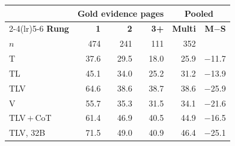 \begin{table}[t]
\centering
\small
\setlength{\tabcolsep}{5pt}
\renewcommand{\arraystretch}{1.12}
\begin{tabular}{@{}lrrrrr@{}}
\toprule
 & \multicolumn{3}{c}{\textbf{Gold evidence pages}} & \multicolumn{2}{c}{\textbf{Pooled}} \\
\cmidrule(lr){2-4}\cmidrule(lr){5-6}
\rowcolor{hdrbg}
\textbf{Rung} & \textbf{1} & \textbf{2} & \textbf{3+} & \textbf{Multi} & \textbf{M$-$S} \\
\rowcolor{hdrbg}
\textcolor{ngray}{\scriptsize$n$}
  & \textcolor{ngray}{\scriptsize474}
  & \textcolor{ngray}{\scriptsize241}
  & \textcolor{ngray}{\scriptsize111}
  & \textcolor{ngray}{\scriptsize352}
  & \\
\midrule
T   & 37.6 & 29.5 & 18.0 & 25.9 & \cellcolor{gapred!12}$-$11.7 \\
TL  & 45.1 & 34.0 & 25.2 & 31.2 & \cellcolor{gapred!17}$-$13.9 \\
TLV & 64.6 & 38.6 & 38.7 & 38.6 & \cellcolor{gapred!42}$-$25.9 \\
V   & 55.7 & 35.3 & 31.5 & 34.1 & \cellcolor{gapred!33}$-$21.6 \\
\midrule
\rowcolor{leverbg}
TLV\,$+$\,CoT & 61.4 & 46.9 & 40.5 & 44.9 & \cellcolor{gapred!22}$-$16.5 \\
\rowcolor{leverbg}
TLV, 32B      & 71.5 & 49.0 & 40.9 & 46.4 & \cellcolor{gapred!40}$-$25.1 \\
\bottomrule
\end{tabular}


\end{table}
